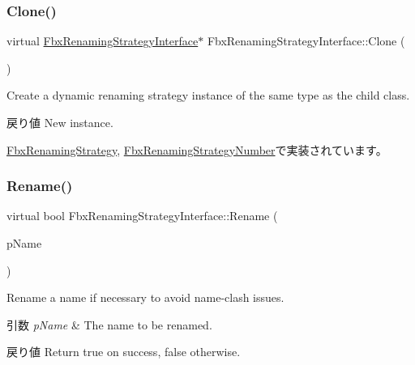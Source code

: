 \mbox{\label{class_fbx_renaming_strategy_interface_ab394ed8a9b5d3ec40334bc933af83907}} 
\subsubsection{\texorpdfstring{Clone()}{Clone()}}
{\footnotesize\ttfamily virtual \hyperlink{class_fbx_renaming_strategy_interface}{Fbx\+Renaming\+Strategy\+Interface}$\ast$ Fbx\+Renaming\+Strategy\+Interface\+::\+Clone (\begin{DoxyParamCaption}{ }\end{DoxyParamCaption})\hspace{0.3cm}{\ttfamily [pure virtual]}}

Create a dynamic renaming strategy instance of the same type as the child class. \begin{DoxyReturn}{戻り値}
New instance. 
\end{DoxyReturn}


\hyperlink{class_fbx_renaming_strategy_a36d1f3cc01ea460ab97d95fc8d8dd136}{Fbx\+Renaming\+Strategy}, \hyperlink{class_fbx_renaming_strategy_number_a05a9960c25cbbabb79ab020930fed395}{Fbx\+Renaming\+Strategy\+Number}で実装されています。

\mbox{\label{class_fbx_renaming_strategy_interface_a1b91016c68dd9c7031624026fd39638a}} 
\subsubsection{\texorpdfstring{Rename()}{Rename()}}
{\footnotesize\ttfamily virtual bool Fbx\+Renaming\+Strategy\+Interface\+::\+Rename (\begin{DoxyParamCaption}\item[{\hyperlink{class_fbx_name_handler}{Fbx\+Name\+Handler} \&}]{p\+Name }\end{DoxyParamCaption})\hspace{0.3cm}{\ttfamily [pure virtual]}}

Rename a name if necessary to avoid name-\/clash issues. 
\begin{DoxyParams}{引数}
{\em p\+Name} & The name to be renamed. \\
\hline
\end{DoxyParams}
\begin{DoxyReturn}{戻り値}
Return {\ttfamily true} on success, {\ttfamily false} otherwise. 
\end{DoxyReturn}


